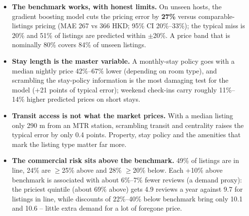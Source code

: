 \documentclass[10pt,a4paper]{article}
\begin{document}
\begin{itemize}[leftmargin=0.55cm,itemsep=2pt,topsep=2pt,parsep=0pt]
\item \textbf{The benchmark works, with honest limits.} On unseen hosts, the gradient boosting model cuts the pricing error by \textbf{27\%} versus comparable-listings pricing (MAE 267 vs 366 HKD; 95\% CI 20\%--33\%); the typical miss is 20\% and 51\% of listings are predicted within $\pm$20\%. A price band that is nominally 80\% covers 84\% of unseen listings.
\item \textbf{Stay length is the master variable.} A monthly-stay policy goes with a median nightly price 42\%--67\% lower (depending on room type), and scrambling the stay-policy information is the most damaging test for the model (+21 points of typical error); weekend check-ins carry roughly 11\%--14\% higher predicted prices on short stays.
\item \textbf{Transit access is not what the market prices.} With a median listing only 290 m from an MTR station, scrambling transit and centrality raises the typical error by only 0.4 points. Property, stay policy and the amenities that mark the listing type matter far more.
\item \textbf{The commercial risk sits above the benchmark.} 49\% of listings are in line, 24\% are $\geq$25\% above and 28\% $\geq$20\% below. Each +10\% above benchmark is associated with about 6\%--7\% fewer reviews (a demand proxy): the priciest quintile (about 69\% above) gets 4.9 reviews a year against 9.7 for listings in line, while discounts of 22\%--40\% below benchmark bring only 10.1 and 10.6 -- little extra demand for a lot of foregone price.
\end{itemize}
\end{document}
